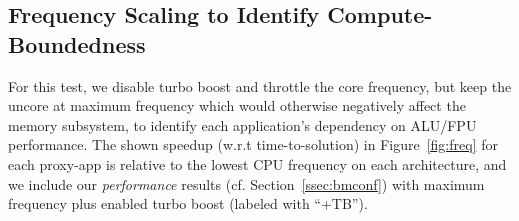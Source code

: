 \subsection{Frequency Scaling to Identify Compute-Boundedness}\label{ssec:eval_freq}
%
For this test, we disable turbo boost and throttle the core frequency, but keep the uncore at maximum frequency which would otherwise negatively
affect the memory subsystem, to identify each application's dependency on ALU/FPU performance. The shown speedup (w.r.t time-to-solution) in Figure~\ref{fig:freq}
for each proxy-app is relative to the lowest CPU frequency on each architecture, and we include our \textit{performance} results
(cf. Section~\ref{ssec:bmconf}) with maximum frequency plus enabled turbo boost (labeled with ``+TB'').

